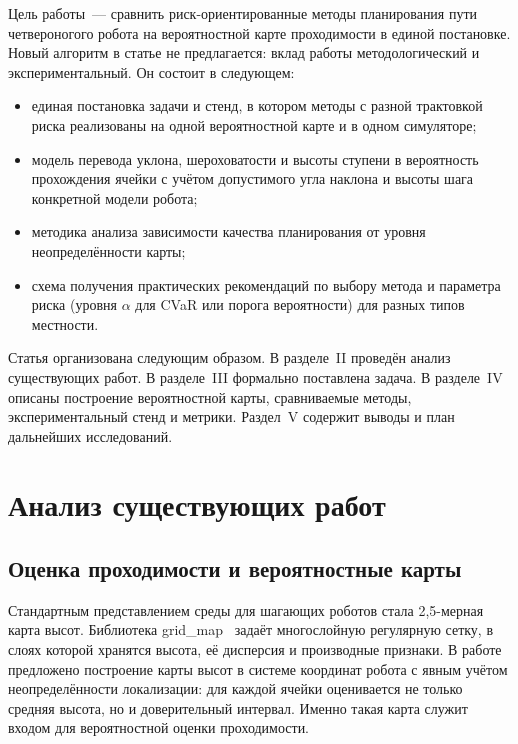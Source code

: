 \documentclass{misisarticle}
\begin{document}
Цель работы~--- сравнить риск-ориентированные методы планирования пути четвероногого робота на вероятностной карте проходимости в единой постановке. Новый алгоритм в статье не предлагается: вклад работы методологический и экспериментальный. Он состоит в следующем:
\begin{itemize}
  \item единая постановка задачи и стенд, в котором методы с разной трактовкой риска реализованы на одной вероятностной карте и в одном симуляторе;
  \item модель перевода уклона, шероховатости и высоты ступени в вероятность прохождения ячейки с учётом допустимого угла наклона и высоты шага конкретной модели робота;
  \item методика анализа зависимости качества планирования от уровня неопределённости карты;
  \item схема получения практических рекомендаций по выбору метода и параметра риска (уровня $\alpha$ для CVaR или порога вероятности) для разных типов местности.
\end{itemize}

Статья организована следующим образом. В разделе~II проведён анализ существующих работ. В разделе~III формально поставлена задача. В разделе~IV описаны построение вероятностной карты, сравниваемые методы, экспериментальный стенд и метрики. Раздел~V содержит выводы и план дальнейших исследований.

\section{Анализ существующих работ}

\subsection{Оценка проходимости и вероятностные карты}

Стандартным представлением среды для шагающих роботов стала 2,5-мерная карта высот. Библиотека grid\_map~\cite{fankhauser2016} задаёт многослойную регулярную сетку, в слоях которой хранятся высота, её дисперсия и производные признаки. В работе~\cite{fankhauser2018} предложено построение карты высот в системе координат робота с явным учётом неопределённости локализации: для каждой ячейки оценивается не только средняя высота, но и доверительный интервал. Именно такая карта служит входом для вероятностной оценки проходимости.
\end{document}
